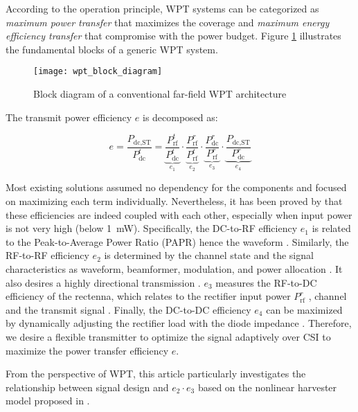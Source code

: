 According to the operation principle, WPT systems can be categorized as \textit{maximum power transfer} that maximizes the coverage and \textit{maximum energy efficiency transfer} \cite{Hui2014} that compromise with the power budget. Figure \ref{fig:wpt-block-diagram} illustrates the fundamental blocks of a generic WPT system.

\begin{figure}
  \centering
    \texttt{[image: wpt\_block\_diagram]}
  \caption{Block diagram of a conventional far-field WPT architecture \cite{Clerckx2018a}}
  \label{fig:wpt-block-diagram}
\end{figure}

The transmit power efficiency $e$ is decomposed as:

\begin{equation}\label{eqn:power_utilization_efficiency}
  e = \frac{{{P_{{\text{dc}},{\text{ST}}}}}}{{P_{{\text{dc}}}^t}} = \underbrace {\frac{{P_{{\text{rf}}}^t}}{{P_{{\text{dc}}}^t}}}_{{e_1}} \cdot \underbrace {\frac{{P_{{\text{rf}}}^r}}{{P_{{\text{rf}}}^t}}}_{{e_2}} \cdot \underbrace {\frac{{P_{{\text{dc}}}^r}}{{P_{{\text{rf}}}^r}}}_{{e_3}} \cdot \underbrace {\frac{{{P_{{\text{dc}},{\text{ST}}}}}}{{P_{{\text{dc}}}^r}}}_{{e_4}}
\end{equation}

Most existing solutions assumed no dependency for the components and focused on maximizing each term individually. Nevertheless, it has been proved by \cite{Boshkovska2015, Clerckx2016, Zeng2017} that these efficiencies are indeed coupled with each other, especially when input power is not very high (below \SI{1}{\mW}). Specifically, the DC-to-RF efficiency ${e_1}$ is related to the Peak-to-Average Power Ratio (PAPR) hence the waveform \cite{Boaventura2011}. Similarly, the RF-to-RF efficiency ${e_2}$ is determined by the channel state and the signal characteristics as waveform, beamformer, modulation, and power allocation \cite{Clerckx2019}. It also desires a highly directional transmission \cite{Takahashi2011}. ${e_3}$ measures the RF-to-DC efficiency of the rectenna, which relates to the rectifier input power ${P_{{\text{rf}}}^r}$ \cite{Trotter2009, Chen2017, Clerckx2018a}, channel and the transmit signal \cite{Collado2014, Boaventura2015, Clerckx2019}. Finally, the DC-to-DC efficiency ${e_4}$ can be maximized by dynamically adjusting the rectifier load with the diode impedance \cite{Dolgov2010}. Therefore, we desire a flexible transmitter to optimize the signal adaptively over CSI to maximize the power transfer efficiency $e$.

From the perspective of WPT, this article particularly investigates the relationship between signal design and ${e_2} \cdot {e_3}$ based on the nonlinear harvester model proposed in \cite{Clerckx2016}.
